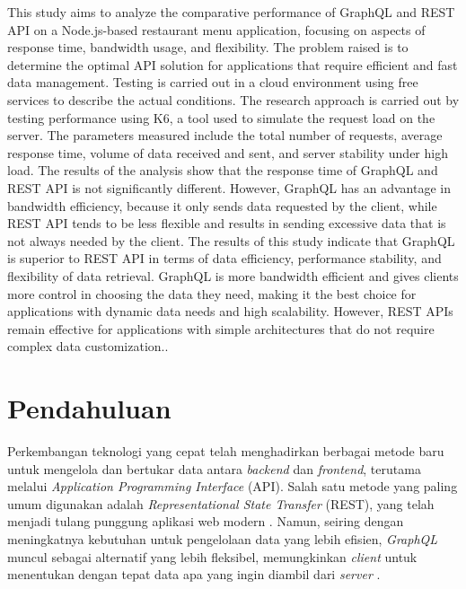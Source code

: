\documentclass[
 manuscript=article,  %
  layout=publish, 
  year=2024, 
  month= Februari, %
  volume=8,
  number=1 
]{JIKO}
\begin{document}
\begin{abstracting}
This study aims to analyze the comparative performance of GraphQL and REST API on a Node.js-based restaurant menu application, focusing on aspects of response time, bandwidth usage, and flexibility. The problem raised is to determine the optimal API solution for applications that require efficient and fast data management. Testing is carried out in a cloud environment using free services to describe the actual conditions. The research approach is carried out by testing performance using K6, a tool used to simulate the request load on the server. The parameters measured include the total number of requests, average response time, volume of data received and sent, and server stability under high load. The results of the analysis show that the response time of GraphQL and REST API is not significantly different. However, GraphQL has an advantage in bandwidth efficiency, because it only sends data requested by the client, while REST API tends to be less flexible and results in sending excessive data that is not always needed by the client. The results of this study indicate that GraphQL is superior to REST API in terms of data efficiency, performance stability, and flexibility of data retrieval. GraphQL is more bandwidth efficient and gives clients more control in choosing the data they need, making it the best choice for applications with dynamic data needs and high scalability. However, REST APIs remain effective for applications with simple architectures that do not require complex data customization..
\end{abstracting}

\section{Pendahuluan}
Perkembangan teknologi yang cepat telah menghadirkan berbagai metode baru untuk mengelola dan bertukar data antara \textit{backend} dan \textit{frontend}, terutama melalui \textit{Application Programming Interface} (API). Salah satu metode yang paling umum digunakan adalah \textit{Representational State Transfer} (REST), yang telah menjadi tulang punggung aplikasi web modern \cite{1}. Namun, seiring dengan meningkatnya kebutuhan untuk pengelolaan data yang lebih efisien, \textit{GraphQL} muncul sebagai alternatif yang lebih fleksibel, memungkinkan \textit{client} untuk menentukan dengan tepat data apa yang ingin diambil dari \textit{server} \cite{2}.
\end{document}
